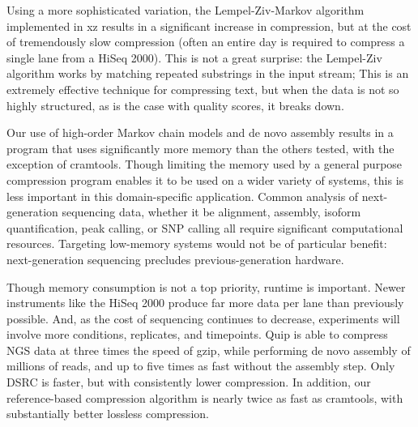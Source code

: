 \documentclass[twocolumn]{article}
\begin{document}
Using a more sophisticated variation, the Lempel-Ziv-Markov algorithm
implemented in xz results in a significant increase in compression, but at the
cost of tremendously slow compression (often an entire day is required to
compress a single lane from a HiSeq 2000). This is not a great surprise: the
Lempel-Ziv algorithm works by matching repeated substrings in the input
stream; This is an extremely effective technique for compressing text, but
when the data is not so highly structured, as is the case with quality scores,
it breaks down.




Our use of high-order Markov chain models and de novo assembly results in a
program that uses significantly more memory than the others tested, with the
exception of cramtools. Though limiting the memory used by a general purpose
compression program enables it to be used on a wider variety of systems, this
is less important in this domain-specific application. Common analysis of
next-generation sequencing data, whether it be alignment, assembly, isoform
quantification, peak calling, or SNP calling all require significant
computational resources. Targeting low-memory systems would not be of
particular benefit: next-generation sequencing precludes previous-generation
hardware.

Though memory consumption is not a top priority, runtime is important. Newer
instruments like the HiSeq 2000 produce far more data per lane than previously
possible. And, as the cost of sequencing continues to decrease, experiments
will involve more conditions, replicates, and timepoints.  Quip is able to
compress NGS data at three times the speed of gzip, while performing de novo
assembly of millions of reads, and up to five times as fast without the
assembly step. Only DSRC is faster, but with consistently lower compression.
In addition, our reference-based compression algorithm is nearly twice as fast
as cramtools, with substantially better lossless compression.





\end{document}
